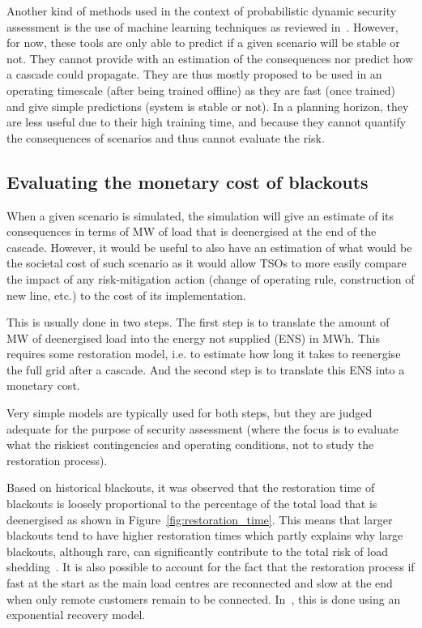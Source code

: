 Another kind of methods used in the context of probabilistic dynamic security assessment is the use of machine learning techniques as reviewed in~\cite{MLEfthymios}. However, for now, these tools are only able to predict if a given scenario will be stable or not. They cannot provide with an estimation of the consequences nor predict how a cascade could propagate. They are thus mostly proposed to be used in an operating timescale (after being trained offline) as they are fast (once trained) and give simple predictions (system is stable or not). In a planning horizon, they are less useful due to their high training time, and because they cannot quantify the consequences of scenarios and thus cannot evaluate the risk.


\subsection{Evaluating the monetary cost of blackouts}
\label{sec:blackout_cost}

When a given scenario is simulated, the simulation will give an estimate of its consequences in terms of MW of load that is deenergised at the end of the cascade. However, it would be useful to also have an estimation of what would be the societal cost of such scenario as it would allow TSOs to more easily compare the impact of any risk-mitigation action (change of operating rule, construction of new line, etc.) to the cost of its implementation.

This is usually done in two steps. The first step is to translate the amount of MW of deenergised load into the energy not supplied (ENS) in MWh. This requires some restoration model, i.e. to estimate how long it takes to reenergise the full grid after a cascade. And the second step is to translate this ENS into a monetary cost.

Very simple models are typically used for both steps, but they are judged adequate for the purpose of security assessment (where the focus is to evaluate what the riskiest contingencies and operating conditions, not to study the restoration process).

Based on historical blackouts, it was observed that the restoration time of blackouts is loosely proportional to the percentage of the total load that is deenergised as shown in Figure~\ref{fig:restoration_time}. This means that larger blackouts tend to have higher restoration times which partly explains why large blackouts, although rare, can significantly contribute to the total risk of load shedding~\cite{CascadingMethodoAndChallenges}. It is also possible to account for the fact that the restoration process if fast at the start as the main load centres are reconnected and slow at the end when only remote customers remain to be connected. In~\cite{TwoLevelPSA}, this is done using an exponential recovery model.

